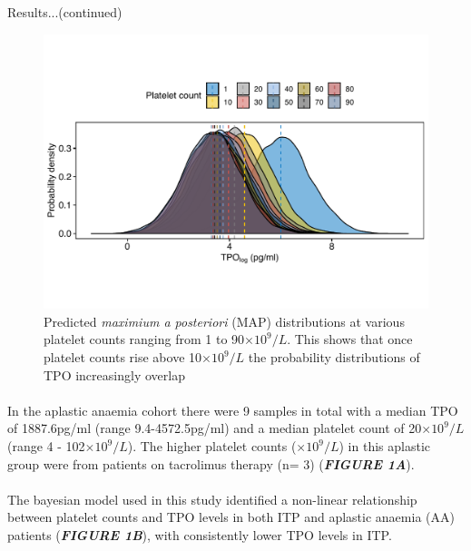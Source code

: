 \documentclass[landscape,a0paper,fontscale=0.285]{beamer} %
\newlength{\onecolwid}
\newlength{\twocolwid}
\begin{document}
\begin{frame}[t]
\begin{columns}[t]
\begin{column}{\twocolwid}
\begin{columns}[t,totalwidth=\twocolwid]
\begin{column}{\onecolwid}
\begin{block}{Results...(continued)}
\begin{figure}[H]
\includegraphics[width=1\linewidth]{fig/Probability_density.pdf}
\caption{Predicted \textit{maximium a posteriori} (MAP) distributions at various platelet counts ranging from 1 to 90$\times 10^9/L$. This shows that once platelet counts rise above 10$\times 10^9/L$ the probability distributions of TPO increasingly overlap}
\end{figure}

\paragraph{} In the aplastic anaemia cohort there were 9 samples in total with a median TPO of 1887.6pg/ml (range 9.4-4572.5pg/ml) and a median platelet count of 20$\times 10^9/L$ (range 4 - 102$\times 10^9/L$). The higher platelet counts ($\times 10^9/L$) in this aplastic group were from patients on tacrolimus therapy (n= 3) (\textit{\textbf{FIGURE 1A}}). 

\vspace{30pt}

\paragraph{} The bayesian model used in this study identified a non-linear relationship between platelet counts and TPO levels in both ITP and aplastic anaemia (AA) patients (\textbf{\emph{FIGURE 1B}}), with consistently lower TPO levels in ITP. 

\end{block}




\end{column}
\end{columns}
\end{column}
\end{columns}
\end{frame}
\end{document}
